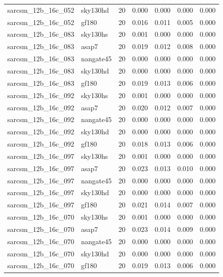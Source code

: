 \begin{tabular}{llrrrrr}
sarcsm\_12b\_16c\_052 & sky130hd & 20 & 0.000 & 0.000 & 0.000 & 0.000 \\
sarcsm\_12b\_16c\_052 & gf180 & 20 & 0.016 & 0.011 & 0.005 & 0.000 \\
sarcsm\_12b\_16c\_083 & sky130hs & 20 & 0.001 & 0.000 & 0.000 & 0.000 \\
sarcsm\_12b\_16c\_083 & asap7 & 20 & 0.019 & 0.012 & 0.008 & 0.000 \\
sarcsm\_12b\_16c\_083 & nangate45 & 20 & 0.000 & 0.000 & 0.000 & 0.000 \\
sarcsm\_12b\_16c\_083 & sky130hd & 20 & 0.000 & 0.000 & 0.000 & 0.000 \\
sarcsm\_12b\_16c\_083 & gf180 & 20 & 0.019 & 0.013 & 0.006 & 0.000 \\
sarcsm\_12b\_16c\_092 & sky130hs & 20 & 0.001 & 0.000 & 0.000 & 0.000 \\
sarcsm\_12b\_16c\_092 & asap7 & 20 & 0.020 & 0.012 & 0.007 & 0.000 \\
sarcsm\_12b\_16c\_092 & nangate45 & 20 & 0.000 & 0.000 & 0.000 & 0.000 \\
sarcsm\_12b\_16c\_092 & sky130hd & 20 & 0.000 & 0.000 & 0.000 & 0.000 \\
sarcsm\_12b\_16c\_092 & gf180 & 20 & 0.018 & 0.013 & 0.006 & 0.000 \\
sarcsm\_12b\_16c\_097 & sky130hs & 20 & 0.001 & 0.000 & 0.000 & 0.000 \\
sarcsm\_12b\_16c\_097 & asap7 & 20 & 0.023 & 0.013 & 0.010 & 0.000 \\
sarcsm\_12b\_16c\_097 & nangate45 & 20 & 0.000 & 0.000 & 0.000 & 0.000 \\
sarcsm\_12b\_16c\_097 & sky130hd & 20 & 0.000 & 0.000 & 0.000 & 0.000 \\
sarcsm\_12b\_16c\_097 & gf180 & 20 & 0.021 & 0.014 & 0.007 & 0.000 \\
sarcsm\_12b\_16c\_070 & sky130hs & 20 & 0.001 & 0.000 & 0.000 & 0.000 \\
sarcsm\_12b\_16c\_070 & asap7 & 20 & 0.023 & 0.014 & 0.009 & 0.000 \\
sarcsm\_12b\_16c\_070 & nangate45 & 20 & 0.000 & 0.000 & 0.000 & 0.000 \\
sarcsm\_12b\_16c\_070 & sky130hd & 20 & 0.000 & 0.000 & 0.000 & 0.000 \\
sarcsm\_12b\_16c\_070 & gf180 & 20 & 0.019 & 0.013 & 0.006 & 0.000 \\
\bottomrule
\end{tabular}
